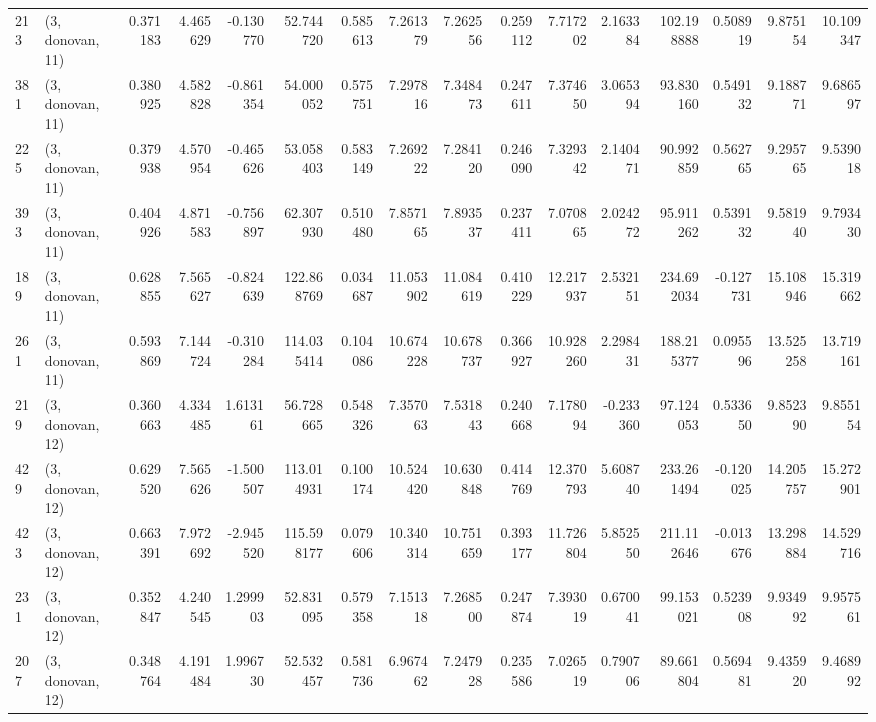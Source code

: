 \begin{tabular}{llrrrrrrrrrrrrrr}
213 &  (3, donovan, 11) &   0.371183 &   4.465629 &  -0.130770 &    52.744720 &   0.585613 &   7.261379 &   7.262556 &  0.259112 &   7.717202 &   2.163384 &   102.198888 &  0.508919 &   9.875154 &  10.109347 \\
381 &  (3, donovan, 11) &   0.380925 &   4.582828 &  -0.861354 &    54.000052 &   0.575751 &   7.297816 &   7.348473 &  0.247611 &   7.374650 &   3.065394 &    93.830160 &  0.549132 &   9.188771 &   9.686597 \\
225 &  (3, donovan, 11) &   0.379938 &   4.570954 &  -0.465626 &    53.058403 &   0.583149 &   7.269222 &   7.284120 &  0.246090 &   7.329342 &   2.140471 &    90.992859 &  0.562765 &   9.295765 &   9.539018 \\
393 &  (3, donovan, 11) &   0.404926 &   4.871583 &  -0.756897 &    62.307930 &   0.510480 &   7.857165 &   7.893537 &  0.237411 &   7.070865 &   2.024272 &    95.911262 &  0.539132 &   9.581940 &   9.793430 \\
189 &  (3, donovan, 11) &   0.628855 &   7.565627 &  -0.824639 &   122.868769 &   0.034687 &  11.053902 &  11.084619 &  0.410229 &  12.217937 &   2.532151 &   234.692034 & -0.127731 &  15.108946 &  15.319662 \\
261 &  (3, donovan, 11) &   0.593869 &   7.144724 &  -0.310284 &   114.035414 &   0.104086 &  10.674228 &  10.678737 &  0.366927 &  10.928260 &   2.298431 &   188.215377 &  0.095596 &  13.525258 &  13.719161 \\
219 &  (3, donovan, 12) &   0.360663 &   4.334485 &   1.613161 &    56.728665 &   0.548326 &   7.357063 &   7.531843 &  0.240668 &   7.178094 &  -0.233360 &    97.124053 &  0.533650 &   9.852390 &   9.855154 \\
429 &  (3, donovan, 12) &   0.629520 &   7.565626 &  -1.500507 &   113.014931 &   0.100174 &  10.524420 &  10.630848 &  0.414769 &  12.370793 &   5.608740 &   233.261494 & -0.120025 &  14.205757 &  15.272901 \\
423 &  (3, donovan, 12) &   0.663391 &   7.972692 &  -2.945520 &   115.598177 &   0.079606 &  10.340314 &  10.751659 &  0.393177 &  11.726804 &   5.852550 &   211.112646 & -0.013676 &  13.298884 &  14.529716 \\
231 &  (3, donovan, 12) &   0.352847 &   4.240545 &   1.299903 &    52.831095 &   0.579358 &   7.151318 &   7.268500 &  0.247874 &   7.393019 &   0.670041 &    99.153021 &  0.523908 &   9.934992 &   9.957561 \\
207 &  (3, donovan, 12) &   0.348764 &   4.191484 &   1.996730 &    52.532457 &   0.581736 &   6.967462 &   7.247928 &  0.235586 &   7.026519 &   0.790706 &    89.661804 &  0.569481 &   9.435920 &   9.468992 \\

\end{tabular}
